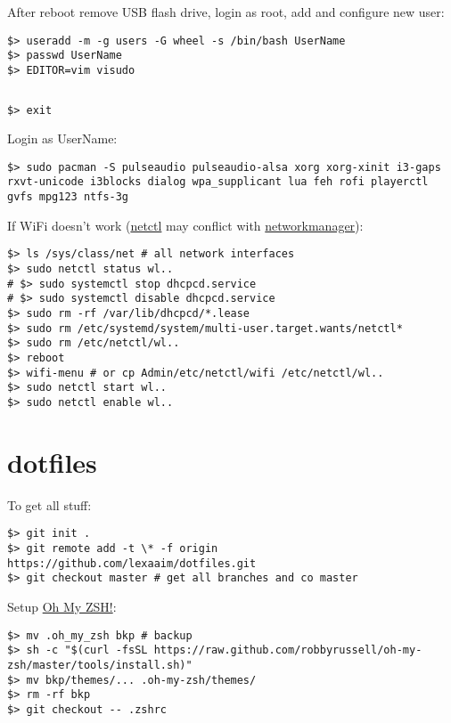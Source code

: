 \documentclass[a4paper, 12pt]{article}
\begin{document}
After reboot remove USB flash drive, login as root, add and configure new user:
\begin{lstlisting}
$> useradd -m -g users -G wheel -s /bin/bash UserName
$> passwd UserName
$> EDITOR=vim visudo
\end{lstlisting}

\begin{lstlisting}[style=style_file,caption={sudoers uncomment:}]
%wheel=ALL (ALL) ALL
\end{lstlisting}

\begin{lstlisting}
$> exit
\end{lstlisting}

Login as UserName:
\begin{lstlisting}
$> sudo pacman -S pulseaudio pulseaudio-alsa xorg xorg-xinit i3-gaps rxvt-unicode i3blocks dialog wpa_supplicant lua feh rofi playerctl gvfs mpg123 ntfs-3g
\end{lstlisting}

If WiFi doesn't work (\url{netctl} may conflict with \url{networkmanager}):
\begin{lstlisting}
$> ls /sys/class/net # all network interfaces
$> sudo netctl status wl..
# $> sudo systemctl stop dhcpcd.service
# $> sudo systemctl disable dhcpcd.service
$> sudo rm -rf /var/lib/dhcpcd/*.lease
$> sudo rm /etc/systemd/system/multi-user.target.wants/netctl*
$> sudo rm /etc/netctl/wl..
$> reboot
$> wifi-menu # or cp Admin/etc/netctl/wifi /etc/netctl/wl..
$> sudo netctl start wl..
$> sudo netctl enable wl..
\end{lstlisting}

\section{dotfiles}

To get all stuff:
\begin{lstlisting}
$> git init .
$> git remote add -t \* -f origin https://github.com/lexaaim/dotfiles.git
$> git checkout master # get all branches and co master
\end{lstlisting}

Setup \url{Oh My ZSH!}:
\begin{lstlisting}
$> mv .oh_my_zsh bkp # backup
$> sh -c "$(curl -fsSL https://raw.github.com/robbyrussell/oh-my-zsh/master/tools/install.sh)"
$> mv bkp/themes/... .oh-my-zsh/themes/
$> rm -rf bkp
$> git checkout -- .zshrc
\end{lstlisting}
\end{document}
